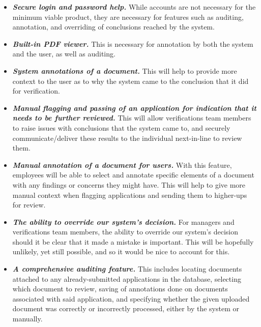 \begin{itemize}[labelindent=0pt, wide]
    \item \textbf{\textit{Secure login and password help.}} While accounts are not necessary for the minimum viable product, they are necessary for features such as auditing, annotation, and overriding of conclusions reached by the system.
    
    \item \textbf{\textit{Built-in PDF viewer.}} This is necessary for annotation by both the system and the user, as well as auditing.
    
    \item \textbf{\textit{System annotations of a document.}} This will help to provide more context to the user as to why the system came to the conclusion that it did for verification.
    
    \item \textbf{\textit{Manual flagging and passing of an application for indication that it needs to be further reviewed.}} This will allow verifications team members to raise issues with conclusions that the system came to, and securely communicate/deliver these results to the individual next-in-line to review them.
    
    \item \textbf{\textit{Manual annotation of a document for users.}} With this feature, employees will be able to select and annotate specific elements of a document with any findings or concerns they might have. This will help to give more manual context when flagging applications and sending them to higher-ups for review.
    
    \item \textbf{\textit{The ability to override our system's decision.}} For managers and verifications team members, the ability to override our system's decision should it be clear that it made a mistake is important. This will be hopefully unlikely, yet still possible, and so it would be nice to account for this.
    
    \item \textbf{\textit{A comprehensive auditing feature.}} This includes locating documents attached to any already-submitted applications in the database, selecting which document to review, saving of annotations done on documents associated with said application, and specifying whether the given uploaded document was correctly or incorrectly processed, either by the system or manually. 
\end{itemize}


